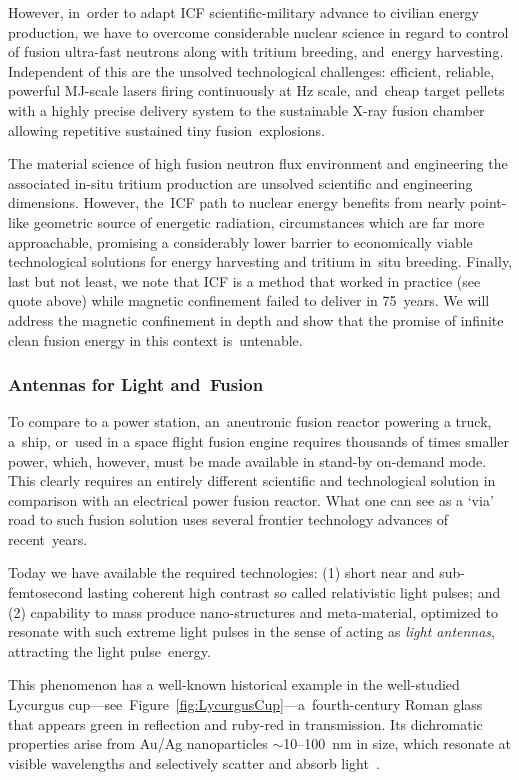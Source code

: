 \documentclass[particles,article,accept,pdftex,moreauthors]{Definitions/mdpi}
\begin{document}
However, in~order to adapt ICF scientific-military advance to civilian energy production, we have to overcome considerable nuclear science in regard to control of fusion ultra-fast neutrons along with tritium breeding, and~energy harvesting. Independent of this are the unsolved technological challenges: efficient, reliable, powerful MJ-scale lasers firing continuously at Hz scale, and~cheap target pellets with a highly precise delivery system to the sustainable X-ray fusion chamber allowing repetitive sustained tiny fusion~explosions.

The material science of high fusion neutron flux environment and engineering the associated in-situ tritium production are unsolved scientific and engineering dimensions. However, the~ICF path to nuclear energy benefits from nearly point-like geometric source of energetic radiation, circumstances which are far more approachable, promising a considerably lower barrier to economically viable technological solutions for energy harvesting and tritium in~situ breeding. Finally, last but not least, we note that ICF is a method that worked in practice (see quote above) while magnetic confinement failed to deliver in 75~years. We will address the magnetic confinement in depth and show that the promise of infinite clean fusion energy in this context is~untenable.
\clearpage 
\subsubsection{Antennas for Light and~Fusion}\label{sssec:nanoF}
To compare to a power station, an~aneutronic fusion reactor powering a truck, a~ship, or~used in a space flight fusion engine requires thousands of times smaller power, which, however, must be made available in stand-by on-demand mode. This clearly requires an entirely different scientific and technological solution in comparison with an electrical power fusion reactor. What one can see as a `via' road to such fusion solution uses several frontier technology advances of recent~years. 

Today we have available the required technologies: (1) short near and sub-femtosecond lasting coherent high contrast so called relativistic light pulses; and (2) capability to mass produce nano-structures and meta-material, optimized to resonate with such extreme light pulses in the sense of acting as {\em light antennas}, attracting the light pulse~energy.

This phenomenon has a well-known historical example in the well-studied Lycurgus cup---see~Figure~\ref{fig:LycurgusCup}---a~fourth-century Roman glass that appears green in reflection and ruby-red in transmission. Its dichromatic properties arise from Au/Ag nanoparticles $\sim$10--100~nm in size, which resonate at visible wavelengths and selectively scatter and absorb light~\cite{freestone2007lycurgus}. 
\end{document}
